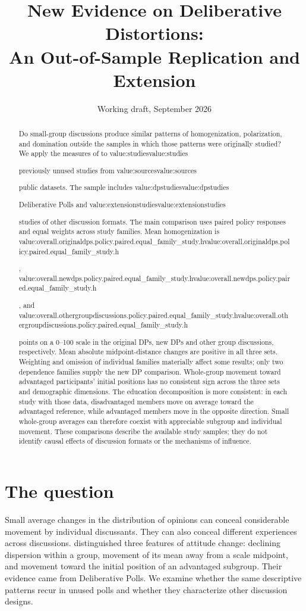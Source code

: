 \documentclass[11pt]{article}
\title{New Evidence on Deliberative Distortions:\\An Out-of-Sample Replication and Extension}
\author{}
\date{Working draft, September 2026}
\newcommand{\valueof}[1]{\ifcsname value:#1\endcsname\csname value:#1\endcsname\else\PackageError{oos}{Missing generated value #1}{Run make oos-paper}\fi}
\newcommand{\overall}[3]{\valueof{overall.#1.policy.paired.#2.#3}}
\begin{document}
\maketitle
\begin{abstract}
Do small-group discussions produce similar patterns of homogenization, polarization,
and domination outside the samples in which those patterns were originally studied?
We apply the measures of \citet{original} to \valueof{studies} previously unused studies
from \valueof{sources} public datasets. The sample includes \valueof{dpstudies}
Deliberative Polls and \valueof{extensionstudies} studies of other discussion formats.
The main comparison uses paired policy responses and equal weights across study
families. Mean homogenization is
\overall{originaldps}{equal_family_study}{h},
\overall{newdps}{equal_family_study}{h}, and
\overall{othergroupdiscussions}{equal_family_study}{h} points on a 0--100 scale in
the original DPs, new DPs and other group discussions, respectively. Mean absolute
midpoint-distance changes are positive in all three sets. Weighting and omission
of individual families materially affect some results; only two dependence
families supply the new DP comparison. Whole-group movement toward advantaged
participants' initial positions has no consistent sign across the three sets and
demographic dimensions. The education decomposition is more consistent:
in each study with those data, disadvantaged members move on average toward the
advantaged reference, while advantaged members move in the opposite direction.
Small whole-group averages can therefore coexist with appreciable subgroup and
individual movement. These comparisons describe the available study samples;
they do not identify causal effects of discussion formats or the mechanisms of influence.
\end{abstract}

\section{The question}
Small average changes in the distribution of opinions can conceal considerable
movement by individual discussants. They can also conceal different experiences
across discussions. \citet{original} distinguished three features of attitude
change: declining dispersion within a group, movement of its mean away from a
scale midpoint, and movement toward the initial position of an advantaged subgroup.
Their evidence came from Deliberative Polls. We examine whether the same descriptive
patterns recur in unused polls and whether they characterize other discussion designs.
\end{document}
